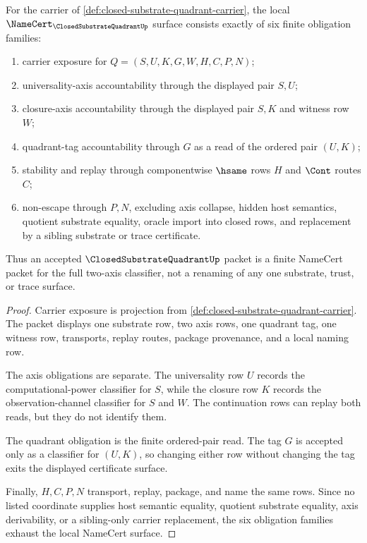 \begin{theorem}
\label{thm:closed-substrate-quadrant-namecert-obligations}
For the carrier of \autoref{def:closed-substrate-quadrant-carrier}, the local $\NameCert_{\ClosedSubstrateQuadrantUp}$ surface consists exactly of six finite obligation families:
\begin{enumerate}
\item carrier exposure for $Q=(S,U,K,G,W,H,C,P,N)$;
\item universality-axis accountability through the displayed pair $S,U$;
\item closure-axis accountability through the displayed pair $S,K$ and witness row $W$;
\item quadrant-tag accountability through $G$ as a read of the ordered pair $(U,K)$;
\item stability and replay through componentwise $\hsame$ rows $H$ and $\Cont$ routes $C$;
\item non-escape through $P,N$, excluding axis collapse, hidden host semantics, quotient substrate equality, oracle import into closed rows, and replacement by a sibling substrate or trace certificate.
\end{enumerate}
Thus an accepted $\ClosedSubstrateQuadrantUp$ packet is a finite NameCert packet for the full two-axis classifier, not a renaming of any one substrate, trust, or trace surface.
\end{theorem}
\begin{proof}
Carrier exposure is projection from \autoref{def:closed-substrate-quadrant-carrier}. The packet displays one substrate row, two axis rows, one quadrant tag, one witness row, transports, replay routes, package provenance, and a local naming row.

The axis obligations are separate. The universality row $U$ records the computational-power classifier for $S$, while the closure row $K$ records the observation-channel classifier for $S$ and $W$. The continuation rows can replay both reads, but they do not identify them.

The quadrant obligation is the finite ordered-pair read. The tag $G$ is accepted only as a classifier for $(U,K)$, so changing either row without changing the tag exits the displayed certificate surface.

Finally, $H,C,P,N$ transport, replay, package, and name the same rows. Since no listed coordinate supplies host semantic equality, quotient substrate equality, axis derivability, or a sibling-only carrier replacement, the six obligation families exhaust the local NameCert surface.
\end{proof}

